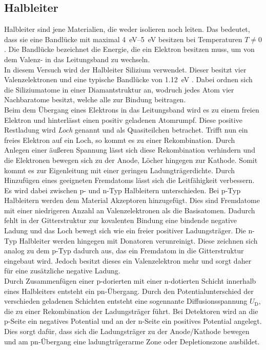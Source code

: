 \subsection{Halbleiter}
\label{sec:Halbleiter-Theorie}
Halbleiter sind jene Materialien, die weder isolieren noch leiten. Das bedeutet, dass sie eine Bandlücke mit maximal \SIrange{4}{5}{\electronvolt} besitzen bei Temperaturen $T \neq 0$. Die Bandlücke bezeichnet die Energie, die ein Elektron besitzen muss, um von dem Valenz- in das Leitungsband zu wechseln.\\
In diesem Versuch wird der Halbleiter Silizium verwendet. Dieser besitzt vier
Valenzelektronen und eine typische Bandlücke von \SI{1.12}{\electronvolt} \cite{chemie}. Dabei ordnen sich die Siliziumatome in einer Diamantstruktur an, wodruch jedes Atom vier Nachbaratome besitzt, welche alle zur Bindung
beitragen.\\
Beim dem Übergang eines Elektrons in das Leitungsband wird es zu einem freien Elektron und hinterlässt einen positiv geladenen Atomrumpf. Diese positive Restladung wird \textit{Loch} genannt und als Quasiteilchen betrachet. Trifft nun ein freies Elektron auf ein Loch, so kommt es zu einer Rekombination. Durch Anlegen einer äußeren Spannung lässt sich diese Rekombination verhindern und die Elektronen bewegen sich zu der Anode, Löcher hingegen zur Kathode. Somit kommt es zur Eigenleitung mit einer geringen Ladungträgerdichte.
Durch Hinzufügen eines geeigneten Fremdatoms lässt sich die Leitfähigkeit verbessern. Es wird dabei zwischen p- und n-Typ Halbleitern unterschieden.
Bei p-Typ Halbleitern werden dem Material Akzeptoren hinzugefügt. Dies sind Fremdatome mit einer niedrigeren Anzahl an Valenzelektronen als die Basisatomen. Dadurch fehlt in der Gitterstruktur zur kovalenten Bindung eine bindende negative Ladung und das Loch bewegt sich wie ein freier positiver Ladungsträger.
Die n-Typ Halbleiter werden hingegen mit Donatoren verunreinigt. Diese zeichnen sich analog zu dem p-Typ dadurch aus, das ein Fremdatom in die Gitterstruktur eingebaut wird. Jedoch besitzt dieses ein Valenzelektron mehr und sorgt daher für eine zusätzliche negative Ladung.\\
Durch Zusammenfügen einer p-dorierten mit einer n-dotierten Schicht innerhalb eines Halbleiters entsteht ein pn-Übergang. Durch den Potentialunterschied der verschieden geladenen Schichten entsteht eine sogennante Diffusionsspannung $U_\text{D}$, die zu einer Rekombination der Ladungsträger führt. Bei Detektoren wird an die p-Seite ein negatives Potential und an der n-Seite ein positives Potential angelegt. Dies sorgt dafür, dass sich die Ladungsträger zu der Anode/Kathode bewegen und am pn-Übergang eine ladungträgerarme Zone oder Depletionszone ausbildet.
